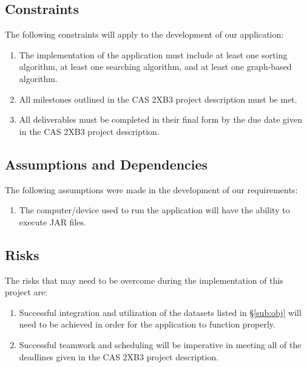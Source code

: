 \documentclass[english]{article}
\begin{document}

\subsection{Constraints}
\label{sub:constraints}
The following constraints will apply to the development of our application:
\begin{enumerate}
    \item The implementation of the application must include at least one sorting algorithm, at least one searching algorithm, and at least one graph-based algorithm.
	\item All milestones outlined in the CAS 2XB3 project description must be met.
	\item All deliverables must be completed in their final form by the due date given in the CAS 2XB3 project description.
\end{enumerate}

\subsection{Assumptions and Dependencies}
\label{sub:assumptions_and_dependencies}
The following assumptions were made in the development of our requirements:
\begin{enumerate}
	\item The computer/device used to run the application will have the ability to execute JAR files.
\end{enumerate}

\subsection{Risks}

The risks that may need to be overcome during the implementation of this project are:

\medskip
\begin{enumerate}

\item Successful integration and utilization of the datasets listed in \hyperref[sub:obj]{\S\ref*{sub:obj}} will need to be achieved in order for the application to function properly.
\item Successful teamwork and scheduling will be imperative in meeting all of the deadlines given in the CAS 2XB3 project description.

\end{enumerate}
\end{document}
